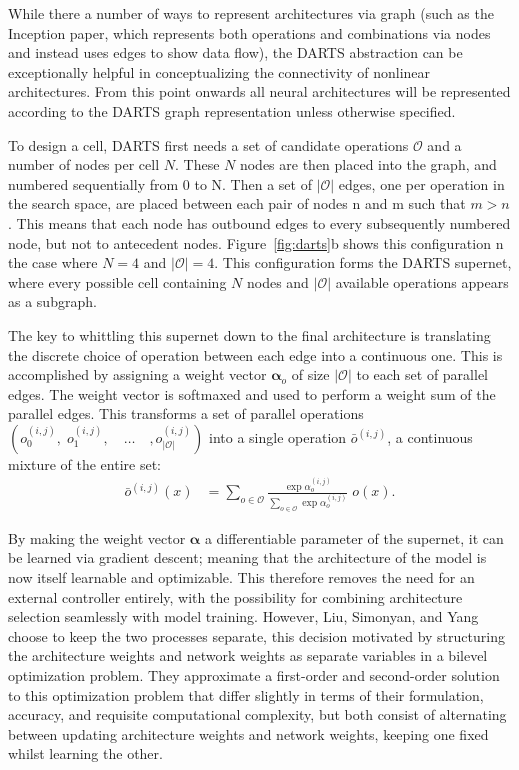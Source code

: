While there a number of ways to represent architectures via graph (such as the Inception paper, which represents both
operations and combinations via nodes and instead uses edges to show data flow), the DARTS abstraction
can be exceptionally helpful in conceptualizing the connectivity of nonlinear architectures. From this point onwards all neural
architectures will be represented according to the DARTS graph representation unless otherwise specified.

To design a cell, DARTS first needs a set of candidate operations $\mathcal{O}$ and a number of nodes per cell $N$.
These $N$ nodes are then placed into the graph, and numbered sequentially from 0 to N.
Then a set of $|\mathcal{O}|$ edges, one per operation in the search space, are placed between each pair of nodes n and m
such that $m>n$. This means that each node has outbound edges to every subsequently numbered node, but not to antecedent
nodes. Figure~\ref{fig:darts}b shows this configuration n the case where $N=4$ and $|\mathcal{O}|=4$.
This configuration forms the DARTS supernet,
where every possible cell containing $N$ nodes and $|\mathcal{O}|$ available operations appears as a subgraph.

The key to whittling this supernet down to the final architecture is translating the discrete choice of operation between
each edge into a continuous one. This is accomplished by assigning a weight vector $\mathbf{\alpha}_o$ of size $|\mathcal{O}|$
to each set of parallel edges. The weight vector is softmaxed and used to perform a weight sum of the parallel edges. This
transforms a set of parallel operations $(o_0^{(i,j)}, \;o_1^{(i,j)}, \quad\dots\quad, o_{|\mathcal{O}|}^{(i,j)})$ into a single
operation $\bar{o}^{(i,j)}$, a continuous mixture of the entire set:
\begin{align}
    \bar{o}^{(i,j)}(x) &= \sum_{o \in \mathcal{O}} \frac{\exp\alpha_o^{(i,j)}}{\sum_{o \in \mathcal{O}}\exp\alpha_o^{(i,j)}} \; o(x). \label{eq:darts_ops}
\end{align}

By making the weight vector $\mathbf{\alpha}$ a differentiable parameter of the supernet, it can be learned
via gradient descent; meaning that the architecture of the model is now itself learnable and optimizable. This therefore
removes the need for an external controller entirely, with the possibility for combining architecture selection seamlessly
with model training. However, Liu, Simonyan, and Yang choose to keep the two processes separate, this decision motivated
by structuring the architecture weights and network weights as separate variables in a bilevel optimization problem.
They approximate a first-order and second-order solution to this optimization problem that differ slightly in terms of
their formulation, accuracy, and requisite computational complexity, but both consist of alternating between
updating architecture weights and network weights, keeping one fixed whilst learning the other.


